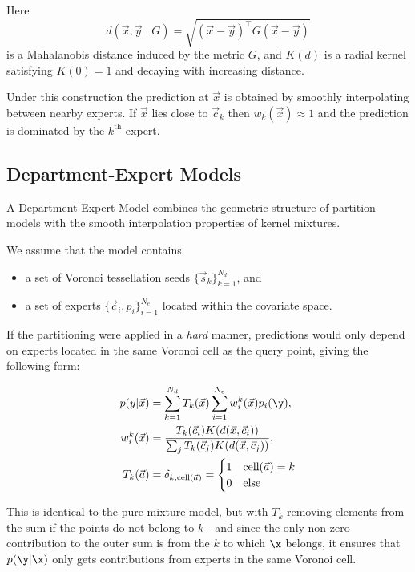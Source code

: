 			Here
			\begin{equation}
				d(\vec{x},\vec{y}\mid G)
				=
				\sqrt{(\vec{x}-\vec{y})^\intercal G (\vec{x}-\vec{y})}
			\end{equation}
			is a Mahalanobis distance induced by the metric $G$, and $K(d)$ is a radial kernel satisfying $K(0)=1$ and decaying with increasing distance.

			Under this construction the prediction at $\vec{x}$ is obtained by smoothly interpolating between nearby experts.
			If $\vec{x}$ lies close to $\vec{c}_k$ then $w_k(\vec{x}) \approx 1$ and the prediction is dominated by the $k^{\text{th}}$ expert.

	\subsection{Department-Expert Models}

		A Department-Expert Model combines the geometric structure of partition models with the smooth interpolation properties of kernel mixtures.

		We assume that the model contains

		\begin{itemize}
			\item a set of Voronoi tessellation seeds $\{\vec{s}_k\}_{k=1}^{N_d}$, and
			\item a set of experts $\{\vec{c}_i,p_i\}_{i=1}^{N_e}$ located within the covariate space.
		\end{itemize}

		If the partitioning were applied in a \emph{hard} manner, predictions would only depend on experts located in the same Voronoi cell as the query point, giving the following form:

		\begin{align}
			p({y}|\vec{x}) & = \sum_{k=1}^{N_d} T_k(\vec{x}) \sum_{i=1}^{N_e} w^k_i(\vec{x}) p_i(\y),
			\\
			w^k_i(\vec{x}) & =
			\frac{T_k(\vec{c}_i) K(d(\vec{x},\vec{c}_i))}
			{\sum_j T_k(\vec{c}_j) K(d(\vec{x},\vec{c}_j))},
			\\
			T_k(\vec{a})   & = \delta_{k,\text{cell}(\vec{a})} =  \begin{cases} 1 & \text{cell}(\vec{a}) = k \\ 0 & \text{else} \end{cases}
		\end{align}

		This is identical to the pure mixture model, but with $T_k$ removing elements from the sum if the points do not belong to $k$ - and since the only non-zero contribution to the outer sum is from the $k$ to which $\x$ belongs, it ensures that $p(\y|\x)$ only gets contributions from experts in the same Voronoi cell.

